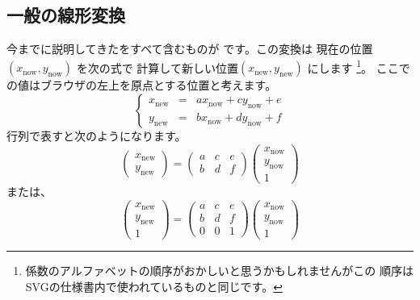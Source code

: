 \subsection{一般の線形変換}
今までに説明してきたをすべて含むものが
です。この変換は
現在の位置$(x_{\mathrm{now}},y_{\mathrm{now}})$ を次の式で
計算して新しい位置$(x_{\mathrm{new}},y_{\mathrm{new}})$ にします
\footnote{係数のアルファベットの順序がおかしいと思うかもしれませんがこの
順序はSVGの仕様書内で使われているものと同じです。}。
ここでの値はブラウザの左上を原点とする位置と考えます。
\begin{equation}
 \left\{\begin{array}{rcl}
 x_{\mathrm{new}} &=&
    ax_{\mathrm{now}}+cy_{\mathrm{now}}+e\\
 y_{\mathrm{new}}  & =&
    bx_{\mathrm{now}}+dy_{\mathrm{now}}+f
	\end{array}\right.\label{matrix}
\end{equation}
行列で表すと次のようになります。
\begin{equation}
\left(\begin{array}{c}x_{\mathrm{new}}\\y_{\mathrm{new}} \end{array}\right)
=\left(\begin{array}{ccc}a&c&e\\b&d&f\end{array}\right)
\left(\begin{array}{c}x_{\mathrm{now}}\\y_{\mathrm{now}}\\1\end{array}\right)
\label{matrix-rep}
\end{equation}
または、
\begin{equation}
\left(\begin{array}{c}x_{\mathrm{new}}\\y_{\mathrm{new}}\\1 \end{array}\right)
=\left(\begin{array}{ccc}a&c&e\\b&d&f\\0&0&1\end{array}\right)
\left(\begin{array}{c}x_{\mathrm{now}}\\y_{\mathrm{now}}\\1\end{array}\right)
\label{matrix-rep-2}
\end{equation}
